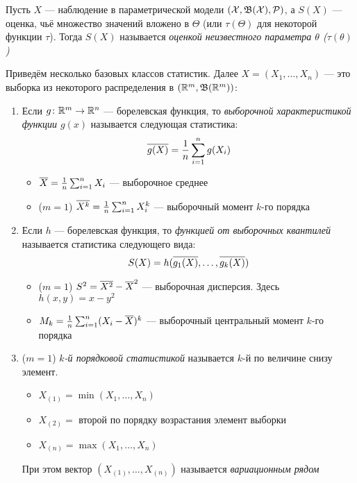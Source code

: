 \begin{definition}
	Пусть $X$ --- наблюдение в параметрической модели $(\mathcal{X}, \mathfrak{B}(\mathcal{X}), \mathcal{P})$, а $S(X)$ --- оценка, чьё множество значений вложено в $\Theta$ (или $\tau(\Theta)$ для некоторой функции $\tau$). Тогда $S(X)$ называется \textit{оценкой неизвестного параметра $\theta$ ($\tau(\theta)$)}
\end{definition}

\begin{example}
	Приведём несколько базовых классов статистик. Далее $X = (X_1, \ldots, X_n)$ --- это выборка из некоторого распределения в $(\mathbb{R}^m, \mathfrak{B}(\mathbb{R}^m))$:
	\begin{enumerate}
		\item Если $g \colon \mathbb{R}^m \to \mathbb{R}^n$ --- борелевская функция, то \textit{выборочной характеристикой функции $g(x)$} называется следующая статистика:
		\[
			\overline{g(X)} = \frac{1}{n} \sum_{i = 1}^n g(X_i)
		\]
		\begin{itemize}
			\item $\overline{X} = \frac{1}{n} \sum_{i = 1}^n X_i$ --- выборочное среднее
			
			\item ($m = 1$) $\overline{X^k} = \frac{1}{n} \sum_{i = 1}^n X_i^k$ --- выборочный момент $k$-го порядка
		\end{itemize}
		
		\item Если $h$ --- борелевская функция, то \textit{функцией от выборочных квантилей} называется статистика следующего вида:
		\[
			S(X) = h(\overline{g_1(X)}, \ldots, \overline{g_k(X)})
		\]
		\begin{itemize}
			\item ($m = 1$) $S^2 = \overline{X^2} - \overline{X}^2$ --- выборочная дисперсия. Здесь $h(x, y) = x - y^2$
			
			\item $M_k = \frac{1}{n} \sum_{i = 1}^n (X_i - \overline{X})^k$ --- выборочный центральный момент $k$-го порядка
		\end{itemize}
	
		\item ($m = 1$) \textit{$k$-й порядковой статистикой} называется $k$-й по величине снизу элемент.
		\begin{itemize}
			\item $X_{(1)} = \min(X_1, \ldots, X_n)$
			
			\item $X_{(2)} =$ второй по порядку возрастания элемент выборки
			
			\item $X_{(n)} = \max(X_1, \ldots, X_n)$
		\end{itemize}
		При этом вектор $(X_{(1)}, \ldots, X_{(n)})$ называется \textit{вариационным рядом}
	\end{enumerate}
\end{example}

